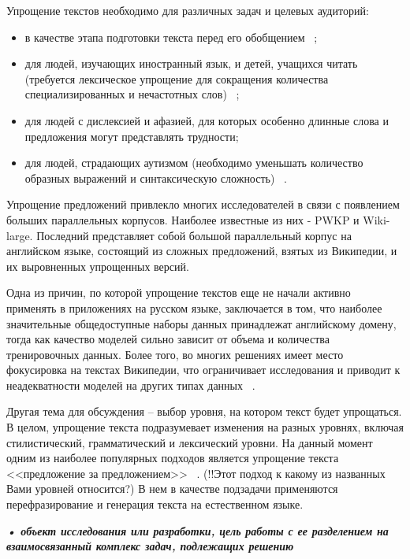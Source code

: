 Упрощение текстов необходимо для различных задач и целевых аудиторий: 
\begin{itemize}
	\item в качестве этапа подготовки текста перед его обобщением ~\cite{finegan_dollak_sentence_2016}; 
	\item для людей, изучающих иностранный язык, и детей, учащихся читать (требуется лексическое упрощение для сокращения количества специализированных и нечастотных слов) ~\cite{liu_simplification_2016};
	\item для людей с дислексией и афазией, для которых особенно длинные слова и предложения могут представлять трудности;
	\item для людей, страдающих аутизмом (необходимо уменьшать количество образных выражений и синтаксическую сложность) ~\cite{evans_evaluation_2014}.
\end{itemize}


Упрощение предложений привлекло многих исследователей в связи с появлением больших параллельных корпусов. Наиболее известные из них - PWKP и Wiki-large. Последний представляет собой большой параллельный корпус на английском языке, состоящий из сложных предложений, взятых из Википедии, и их выровненных упрощенных версий. 

Одна из причин, по которой упрощение текстов еще не начали активно применять в приложениях на русском языке, заключается в том, что наиболее значительные общедоступные наборы данных принадлежат английскому домену, тогда как качество моделей сильно зависит от объема и количества тренировочных данных. Более того, во многих решениях имеет место фокусировка на текстах Википедии, что ограничивает исследования и приводит к неадекватности моделей на других типах данных ~\cite{kazan_federal_university}. 

Другая тема для обсуждения -- выбор уровня, на котором текст будет упрощаться. В целом, упрощение текста подразумевает изменения на разных уровнях, включая стилистический, грамматический и лексический уровни. На данный момент одним из наиболее популярных подходов является упрощение текста <<предложение за предложением>> ~\cite{galeev_rubts_2021}. (!!Этот подход к какому из названных Вами уровней относится?) В нем в качестве подзадачи применяются перефразирование и генерация текста на естественном языке.

\textbf{\textit{•	объект исследования или разработки, цель работы с ее разделением на взаимосвязанный комплекс задач, подлежащих решению}}\\


